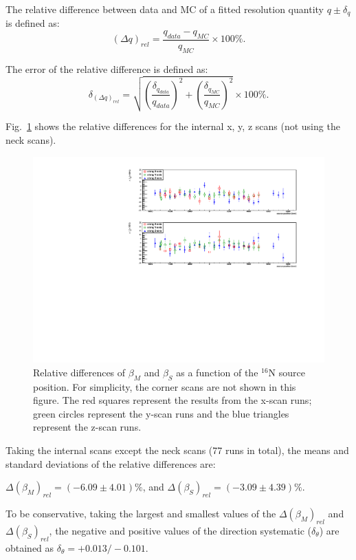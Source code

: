 The relative difference between data and MC of a fitted resolution quantity $q\pm \delta_q$ is defined as:
\begin{equation}
(\Delta q)_{rel} = \frac{q_{data}-q_{MC}}{q_{MC}}\times 100\%.
\end{equation}

The error of the relative difference is defined as: 
\begin{equation}
\delta_{(\Delta q)_{rel}} = \sqrt{(\frac{\delta_{q_{data}}}{q_{data}})^2+(\frac{\delta_{q_{MC}}}{q_{MC}})^2}\times 100\%.
\end{equation}\label{eq:erors_relativeBiases}

Fig.~\ref{relative_biasesVsPositions} shows the relative differences for the internal x, y, z scans (not using the neck scans).
\begin{figure}[!htb]
	\centering
	\includegraphics[width=16cm]{angularResol_scanXYZ.pdf}
	\caption{Relative differences of $\beta_M$ and $\beta_S$ as a function of the $^{16}$N source position. For simplicity, the corner scans are not shown in this figure. The red squares represent the results from the x-scan runs; green circles represent the y-scan runs and the blue triangles represent the z-scan runs.}
	\label{relative_biasesVsPositions}
\end{figure}

Taking the internal scans except the neck scans (77 runs in total), the means and standard deviations of the relative differences are:

$\Delta(\beta_M)_{rel}=(-6.09\pm4.01)\%$, and $\Delta(\beta_S)_{rel}=(-3.09\pm4.39)\%$.

To be conservative, taking the largest and smallest values of the $\Delta(\beta_M)_{rel}$ and $\Delta(\beta_S)_{rel}$, the negative and positive values of the direction systematic ($\delta_\theta$) are obtained as $\delta_\theta=+0.013/-0.101$.


